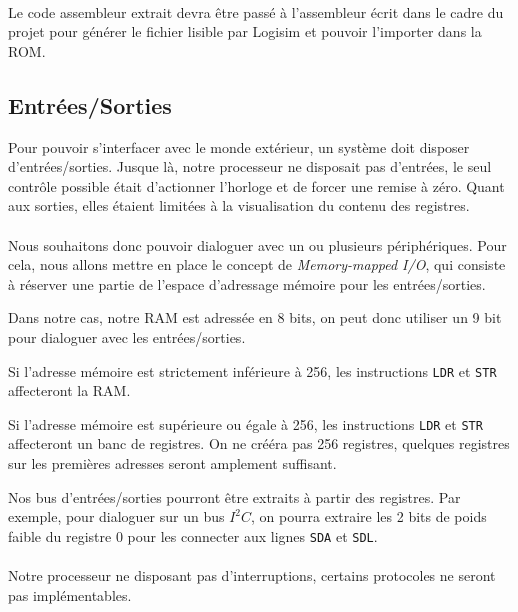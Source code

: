 \paragraph{}
Le code assembleur extrait devra être passé à l'assembleur écrit dans le cadre du projet pour générer le fichier lisible par Logisim et pouvoir l'importer dans la ROM.


\subsection{Entrées/Sorties}

Pour pouvoir s'interfacer avec le monde extérieur, un système doit disposer d'entrées/sorties.
Jusque là, notre processeur ne disposait pas d'entrées, le seul contrôle possible était d'actionner l'horloge et de forcer une remise à zéro.
Quant aux sorties, elles étaient limitées à la visualisation du contenu des registres.

\paragraph{}
Nous souhaitons donc pouvoir dialoguer avec un ou plusieurs périphériques.
Pour cela, nous allons mettre en place le concept de \textit{Memory-mapped I/O}, qui consiste à réserver une partie de l'espace d'adressage mémoire pour les entrées/sorties.

Dans notre cas, notre RAM est adressée en 8 bits, on peut donc utiliser un 9\ieme {} bit pour dialoguer avec les entrées/sorties.

Si l'adresse mémoire est strictement inférieure à 256, les instructions \texttt{LDR} et \texttt{STR} affecteront la RAM.

Si l'adresse mémoire est supérieure ou égale à 256, les instructions \texttt{LDR} et \texttt{STR} affecteront un banc de registres.
On ne crééra pas 256 registres, quelques registres sur les premières adresses seront amplement suffisant.

Nos bus d'entrées/sorties pourront être extraits à partir des registres.
Par exemple, pour dialoguer sur un bus $I^2C$, on pourra extraire les 2 bits de poids faible du registre 0 pour les connecter aux lignes \texttt{SDA} et \texttt{SDL}.

\paragraph{}
Notre processeur ne disposant pas d'interruptions, certains protocoles ne seront pas implémentables.
